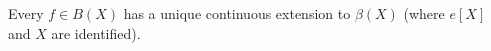 Every $f \in B(X)$ has a unique continuous extension to $\beta(X)$ (where $e[X]$ and $X$ are identified).
